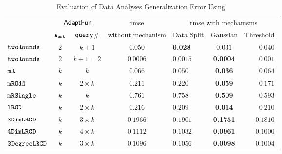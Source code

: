 {\footnotesize
\begin {table}[t]
        \vspace{-0.5cm}
        \caption{Evaluation of Data Analyses Generalization Error Using {\THESYSTEM}}
    \vspace{-0.4cm}
        \label{tb:adapt-generalization}
        \begin{center}
        \centering
{
        \begin{tabular}{|| >{\tiny}l || c | c || c || l | c | r ||  }
                \hhline{t|:======= :t:|}
        \multirow{2}{*}{Program $c$}
         & \multicolumn{2}{c||}{$\textsf{AdaptFun}$}
         & {rmse}
         & \multicolumn{3}{c||}{rmse with mechanisms} \\ 
         \hhline{||~--||~---||}
         & {${\mathtt{A_{est}}}$ } & {${\tt query}$\# } &  without mechanism & Data Split & Gaussian & Threshold  \\ 
         \hline \hline
        $  \mathtt{ twoRounds }$ & $ 2 $ & $  k + 1 $ & $0.050$   & {\textbf{0.028}} & {$0.031$} & $0.040$  \\
        \hhline{||-||--||-||---||}
        $  \mathtt{ twoRounds }$ & $ 2 $ & $  k + 1 = 2 $ & $0.0006$   & {{$0.0015$}} & \textbf{0.0004} & {$0.001$}  \\
        \hhline{||-||--||-||---||}
         $  \mathtt{ mR}$ & $k$ & $k$ & $0.066$   & $0.050$ & {\textbf{0.036}} & $0.064$  \\
         \hhline{||-||--||-||---||}
         $  \mathtt{ mROdd }$ & $ k $ & $  2 \times k $ & $0.211$   & $0.220$ & {\textbf{0.059}} & $0.171$  \\
         \hhline{||-||--||-||---||}
         $  \mathtt{ mRSingle }$ & $ k $ & $  k $ & $ 0.761$   & $ 0.758$ & {\textbf{0.509}} & $ 0.593$  \\
         \hhline{||-||--||-||---||}
         $  \mathtt{ lRGD }$ & $ k $ & $  2\times k $ & $0.216$   & $0.209$ & \textbf{0.014} & $0.210$  \\
         \hhline{||-||--||-||---||}
         $  \mathtt{ 3DimLRGD }$ & $ k $ & $  3\times k $ & $0.1966$   & $0.1901$ & \textbf{0.1751} & $0.1810$  \\
         \hhline{||-||--||-||---||}
         $  \mathtt{ 4DimLRGD }$ & $ k $ & $  4\times k $ & $0.1112$   & $0.1032$ & \textbf{0.0961} & $0.1000$  \\
         \hhline{||-||--||-||---||}
         $  \mathtt{ 3DegreeLRGD }$ & $ k $ & $  3\times k $ & $0.1096$   & $0.1056$ & \textbf{0.0098} & $0.1004$  \\

\end{tabular}}
\end{center}
\end{table}}
